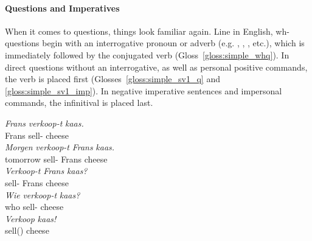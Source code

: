 \paragraph{Questions and Imperatives}
When it comes to questions, things look familiar again.
Line in English, wh-questions begin with an interrogative pronoun or adverb (e.g. , , ,  etc.), which is immediately followed by the conjugated verb (Gloss~\ref{gloss:simple_whq}).
In direct questions without an interrogative, as well as personal positive commands, the verb is placed first (Glosses~\ref{gloss:simple_sv1_q} and \ref{gloss:simple_sv1_imp}).
In negative imperative sentences and impersonal commands, the infinitival is placed last.

\begin{exe}
\ex
\begin{xlist}
\ex\label{gloss:simple_smain}
\gll \textit{Frans} \textit{verkoop-t} \textit{kaas.}\\
Frans sell- cheese\\
\ex\label{gloss:simple_smain_v2}
\gll \textit{Morgen} \textit{verkoop-t} \textit{Frans} \textit{kaas.}\\
tomorrow sell- Frans cheese\\
\ex\label{gloss:simple_sv1_q}
\gll \textit{Verkoop-t} \textit{Frans} \textit{kaas?}\\
sell- Frans cheese\\
\ex\label{gloss:simple_whq}
\gll \textit{Wie} \textit{verkoop-t} \textit{kaas?}\\
who sell- cheese\\
\ex\label{gloss:simple_sv1_imp}
\gll \textit{Verkoop} \textit{kaas!}\\
sell() cheese\\
\end{xlist}
\end{exe}

